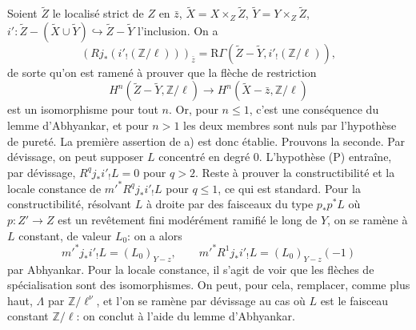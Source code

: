 \documentclass[11pt]{article}
\begin{document}
Soient $\widetilde Z$ le localisé strict de $Z$ en $\bar z$, $\widetilde X=X\times_Z\widetilde Z$, $\widetilde Y=Y\times_Z\widetilde Z$, $i':\widetilde Z-(\widetilde X\cup\widetilde Y)\hookrightarrow \widetilde Z-\widetilde Y$ l'inclusion. On a
\[
(Rj_*(i'_!(\mathbb Z/\ell)))_{\bar z}
=\mathrm R\Gamma(\widetilde Z-\widetilde Y,i'_!(\mathbb Z/\ell)),
\]
de sorte qu'on est ramené à prouver que la flèche de restriction
\[
H^n(\widetilde Z-\widetilde Y,\mathbb Z/\ell)
\longrightarrow
H^n(\widetilde X-\bar z,\mathbb Z/\ell)
\]
est un isomorphisme pour tout $n$. Or, pour $n\le1$, c'est une conséquence du lemme d'Abhyankar, et pour $n>1$ les deux membres sont nuls par l'hypothèse de pureté. La première assertion de a) est donc établie. Prouvons la seconde. Par dévissage, on peut supposer $L$ concentré en degré $0$. L'hypothèse (P) entraîne, par dévissage, $R^qj_*i'_!L=0$ pour $q>2$. Reste à prouver la constructibilité et la locale constance de $m'^*R^qj_*i'_!L$ pour $q\le1$, ce qui est standard. Pour la constructibilité, résolvant $L$ à droite par des faisceaux du type $p_*p^*L$ où $p:Z'\to Z$ est un revêtement fini modérément ramifié le long de $Y$, on se ramène à $L$ constant, de valeur $L_0$: on a alors
\[
m'^*j_*i'_!L=(L_0)_{Y-z},
\qquad
m'^*R^1j_*i'_!L=(L_0)_{Y-z}(-1)
\]
par Abhyankar. Pour la locale constance, il s'agit de voir que les flèches de spécialisation sont des isomorphismes. On peut, pour cela, remplacer, comme plus haut, $\Lambda$ par $\mathbb Z/\ell^\nu$, et l'on se ramène par dévissage au cas où $L$ est le faisceau constant $\mathbb Z/\ell$: on conclut à l'aide du lemme d'Abhyankar.
\end{document}
